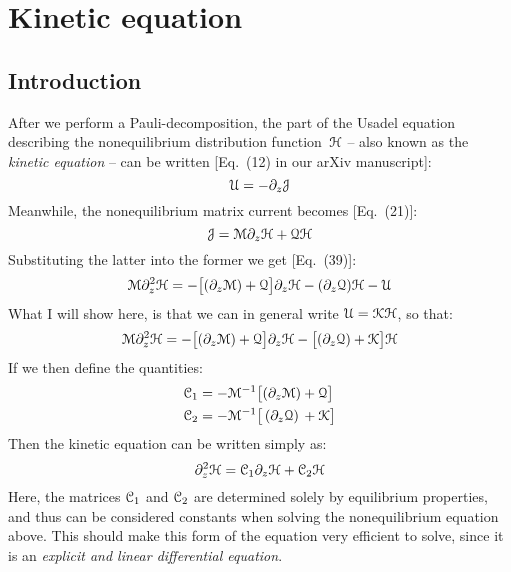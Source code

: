 \chapter{Kinetic equation}
\section{Introduction}
After we perform a Pauli-decomposition, the part of the Usadel equation describing the nonequilibrium distribution function~$\mathcal{H}$ -- also known as the \emph{kinetic equation} -- can be written [Eq.~(12) in our arXiv manuscript]:
\begin{equation}
  \mathcal{U} = -\partial_z \mathcal{J}
\end{equation}
Meanwhile, the nonequilibrium matrix current becomes [Eq.~(21)]:
\begin{equation}
  \mathcal{J} = \mathcal{M}\partial_z\mathcal{H} + \mathcal{Q}\mathcal{H}
\end{equation}
Substituting the latter into the former we get [Eq.~(39)]:
\begin{equation}
  \mathcal{M} \partial_z^2 \mathcal{H} = -\big[ (\partial_z\mathcal{M}) + \mathcal{Q} \big] \partial_z \mathcal{H} - (\partial_z \mathcal{Q}) \mathcal{H} - \mathcal{U}
\end{equation}
What I will show here, is that we can in general write $\mathcal{U} = \mathcal{K} \mathcal{H}$, so that:
\begin{equation}
  \mathcal{M} \partial_z^2 \mathcal{H} = -\big[ (\partial_z\mathcal{M}) + \mathcal{Q} \big] \partial_z \mathcal{H} - \big[ (\partial_z \mathcal{Q}) + \mathcal{K} \big] \mathcal{H}
\end{equation}
If we then define the quantities:
\begin{align}
  \mathcal{C}_1 &= -\mathcal{M}^{-1} \big[ (\partial_z\mathcal{M}) + \mathcal{Q} \big] \\
  \mathcal{C}_2 &= -\mathcal{M}^{-1} \big[ \, (\partial_z\mathcal{Q}) \,+ \mathcal{K} \big]
\end{align}
Then the kinetic equation can be written simply as:
\begin{equation}
  \partial_z^2 \mathcal{H} = \mathcal{C}_1 \partial_z \mathcal{H} + \mathcal{C}_2 \mathcal{H}
\end{equation}
Here, the matrices $\mathcal{C}_1$ and $\mathcal{C}_2$ are determined solely by equilibrium properties, and thus can be considered constants when solving the nonequilibrium equation above.
This should make this form of the equation very efficient to solve, since it is an \emph{explicit and linear differential equation}.

\clearpage
